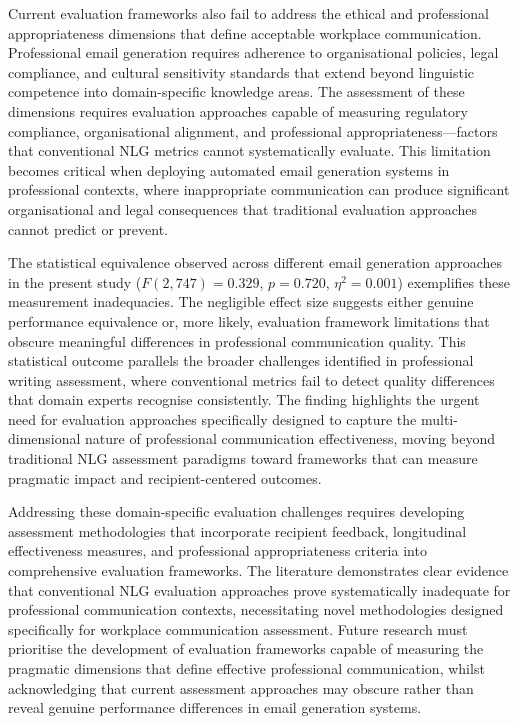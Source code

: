 Current evaluation frameworks also fail to address the ethical and professional appropriateness dimensions that define acceptable workplace communication. Professional email generation requires adherence to organisational policies, legal compliance, and cultural sensitivity standards that extend beyond linguistic competence into domain-specific knowledge areas. The assessment of these dimensions requires evaluation approaches capable of measuring regulatory compliance, organisational alignment, and professional appropriateness—factors that conventional NLG metrics cannot systematically evaluate. This limitation becomes critical when deploying automated email generation systems in professional contexts, where inappropriate communication can produce significant organisational and legal consequences that traditional evaluation approaches cannot predict or prevent.

The statistical equivalence observed across different email generation approaches in the present study ($F(2,747) = 0.329$, $p = 0.720$, $\eta^2 = 0.001$) exemplifies these measurement inadequacies. The negligible effect size suggests either genuine performance equivalence or, more likely, evaluation framework limitations that obscure meaningful differences in professional communication quality. This statistical outcome parallels the broader challenges identified in professional writing assessment, where conventional metrics fail to detect quality differences that domain experts recognise consistently. The finding highlights the urgent need for evaluation approaches specifically designed to capture the multi-dimensional nature of professional communication effectiveness, moving beyond traditional NLG assessment paradigms toward frameworks that can measure pragmatic impact and recipient-centered outcomes.

Addressing these domain-specific evaluation challenges requires developing assessment methodologies that incorporate recipient feedback, longitudinal effectiveness measures, and professional appropriateness criteria into comprehensive evaluation frameworks. The literature demonstrates clear evidence that conventional NLG evaluation approaches prove systematically inadequate for professional communication contexts, necessitating novel methodologies designed specifically for workplace communication assessment. Future research must prioritise the development of evaluation frameworks capable of measuring the pragmatic dimensions that define effective professional communication, whilst acknowledging that current assessment approaches may obscure rather than reveal genuine performance differences in email generation systems.

